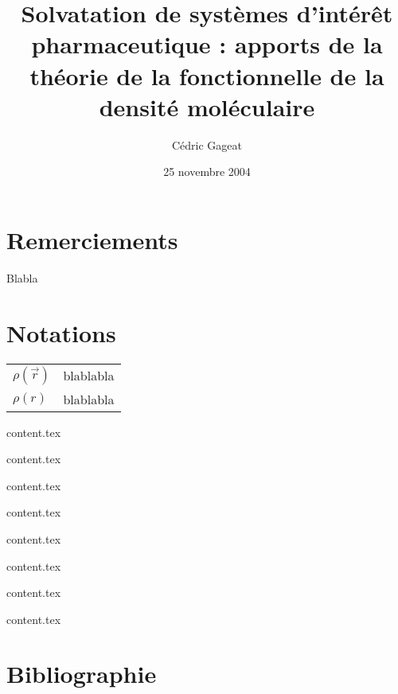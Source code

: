 \documentclass{bredele}
\title{Solvatation de systèmes d’intérêt pharmaceutique : apports de la théorie de la fonctionnelle de la densité moléculaire}
\author{Cédric Gageat}
\date{25 novembre 2004}
\begin{document}
\maketitle


\clearemptydoublepage
\chapter*{Remerciements}
\thispagestyle{empty}
Blabla


\clearemptydoublepage
\chapter*{Notations}
\thispagestyle{empty}
\begin{tabular}{ll}
$\rho(\vec{r})$ & blablabla \\
$\rho(r)$ & blablabla 
\end{tabular}




\clearemptydoublepage
\frontmatter


\clearemptydoublepage
{}

\clearemptydoublepage
\mainmatter




\clearemptydoublepage
{content.tex}


\clearemptydoublepage
{content.tex}


\clearemptydoublepage
{content.tex}


\clearemptydoublepage
{content.tex}


\clearemptydoublepage
{content.tex}


\clearemptydoublepage
{content.tex}


\clearemptydoublepage
{content.tex}


\clearemptydoublepage
{content.tex}


\clearemptydoublepage
\backmatter
\clearemptydoublepage
\chapter*{Bibliographie}

\newpage
\clearemptydoublepage
\tableofcontents
\end{document}
